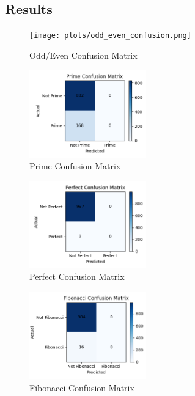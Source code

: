 \documentclass[twoside]{article}
\begin{document}
\begin{multicols}{2}
\section{Results}
\begin{figure}[H]
    \centering
    \texttt{[image: plots/odd\_even\_confusion.png]}
    \caption{Odd/Even Confusion Matrix}
\end{figure}
\begin{figure}[H]
    \centering
    \includegraphics[width=0.45\textwidth]{plots/prime_confusion.png}
    \caption{Prime Confusion Matrix}
\end{figure}
\begin{figure}[H]
    \centering
    \includegraphics[width=0.45\textwidth]{plots/perfect_confusion.png}
    \caption{Perfect Confusion Matrix}
\end{figure}
\begin{figure}[H]
    \centering
    \includegraphics[width=0.45\textwidth]{plots/fibonacci_confusion.png}
    \caption{Fibonacci Confusion Matrix}
\end{figure}
\begin{figure}[H]

\end{figure}
\end{multicols}
\end{document}
